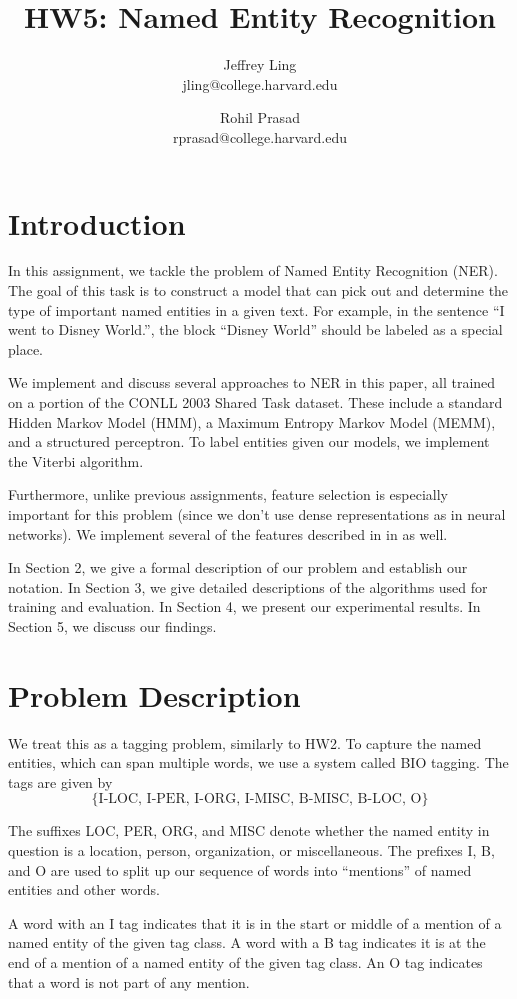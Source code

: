 \documentclass[11pt]{article}
\title{HW5: Named Entity Recognition}
\author{Jeffrey Ling \\ jling@college.harvard.edu \and Rohil Prasad \\ rprasad@college.harvard.edu}
\begin{document}
\maketitle{}
\section{Introduction}

In this assignment, we tackle the problem of Named Entity Recognition (NER). The goal of this task is to construct a model that can pick out and determine the type of important named entities in a given text. For example, in the sentence ``I went to Disney World.'', the block ``Disney World'' should be labeled as a special place. 

We implement and discuss several approaches to NER in this paper, all trained on a portion of the CONLL 2003 Shared Task dataset. These include a standard Hidden Markov Model (HMM), a Maximum Entropy Markov Model (MEMM), and a structured perceptron. To label entities given our models, we implement the Viterbi algorithm.

Furthermore, unlike previous assignments, feature selection is especially important for this problem (since we don't use dense representations as in neural networks). We implement several of the features described in in \cite{conll2003} as well. 

In Section 2, we give a formal description of our problem and establish our notation. In Section 3, we give detailed descriptions of the algorithms used for training and evaluation. In Section 4, we present our experimental results. In Section 5, we discuss our findings. 

\section{Problem Description}

We treat this as a tagging problem, similarly to HW2. To capture the named entities, which can span multiple words, we use a system called BIO tagging. The tags are given by 
$$\{\text{I-LOC, I-PER, I-ORG, I-MISC, B-MISC, B-LOC, O}\}$$

The suffixes LOC, PER, ORG, and MISC denote whether the named entity in question is a location, person, organization, or miscellaneous. The prefixes I, B, and O are used to split up our sequence of words into ``mentions'' of named entities and other words. 

A word with an I tag indicates that it is in the start or middle of a mention of a named entity of the given tag class. A word with a B tag indicates it is at the end of a mention of a named entity of the given tag class. An O tag indicates that a word is not part of any mention. 
\end{document}
